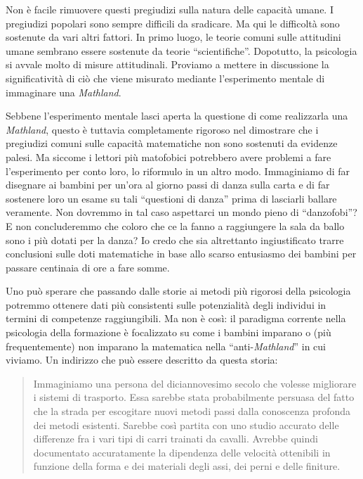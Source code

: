 Non è facile rimuovere questi pregiudizi sulla natura delle capacità umane. I pregiudizi popolari sono sempre difficili da sradicare. Ma qui le difficoltà sono sostenute da vari altri fattori. In primo luogo, le teorie comuni sulle attitudini umane sembrano essere sostenute da teorie “scientifiche”. Dopotutto, la psicologia si avvale molto di misure attitudinali. Proviamo a mettere in discussione la significatività di ciò che viene misurato mediante l'esperimento mentale di immaginare una \textit{Mathland}. 

Sebbene l'esperimento mentale lasci aperta la questione di come realizzarla una \textit{Mathland}, questo è tuttavia completamente rigoroso nel dimostrare che i pregiudizi comuni sulle capacità matematiche non sono sostenuti da evidenze palesi. Ma siccome i lettori più matofobici potrebbero avere problemi a fare l'esperimento per conto loro, lo riformulo in un altro modo. Immaginiamo di far disegnare ai bambini per un'ora al giorno passi di danza sulla carta e di far sostenere loro un esame su tali “questioni di danza” prima di lasciarli ballare veramente. Non dovremmo in tal caso aspettarci un mondo pieno di “danzofobi”? E non concluderemmo che coloro che ce la fanno a raggiungere la sala da ballo sono i più dotati per la danza? Io credo che sia altrettanto ingiustificato trarre conclusioni  sulle doti matematiche in base allo scarso entusiasmo dei bambini per passare centinaia di ore a fare somme.

Uno può sperare che passando dalle storie ai metodi più rigorosi della psicologia potremmo ottenere dati più consistenti sulle potenzialità degli individui in termini di competenze raggiungibili. Ma non è così: il paradigma corrente nella psicologia della formazione è focalizzato su come i bambini imparano o (più frequentemente) non imparano la matematica nella “anti-\textit{Mathland}” in cui viviamo. Un indirizzo che può essere descritto da questa storia:

\begin{quote}
Immaginiamo una persona del diciannovesimo secolo che volesse migliorare i sistemi di trasporto. Essa sarebbe stata probabilmente persuasa del fatto che la strada per escogitare nuovi metodi passi dalla conoscenza profonda dei metodi esistenti. Sarebbe così partita con uno studio accurato delle differenze fra i vari tipi di carri trainati da cavalli. Avrebbe quindi documentato accuratamente la dipendenza delle velocità ottenibili in funzione della forma e dei materiali degli assi, dei perni e delle finiture.
\end{quote}

